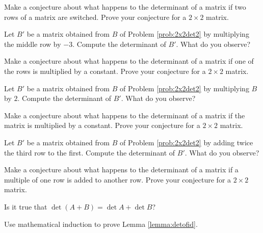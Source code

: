 \documentclass{ximera}
\begin{document}
\begin{problem}\label{prob:2x2rowswitchproof}
Make a conjecture about what happens to the determinant of a matrix if two rows of a matrix are switched.  Prove your conjecture for a $2\times 2$ matrix.
\end{problem}

\begin{problem}\label{prob:scalarmultrowdet} Let $B'$ be a matrix obtained from $B$ of Problem \ref{prob:2x2det2} by multiplying the middle row by $-3$.  Compute the determinant of $B'$.  What do you observe?
\end{problem}

\begin{problem}\label{prob:rowtimesconstant2x2proof}
Make a conjecture about what happens to the determinant of a matrix if one of the rows is multiplied by a constant.  Prove your conjecture for a $2\times 2$ matrix.
\end{problem}

\begin{problem}\label{prob:matrixtimesconst}
Let $B'$ be a matrix obtained from $B$ of Problem \ref{prob:2x2det2} by multiplying $B$ by $2$.  Compute the determinant of $B'$.  What do you observe?
\end{problem}

\begin{problem}\label{prob:matrixtimesconstant2x2proof}
Make a conjecture about what happens to the determinant of a matrix if the matrix is multiplied by a constant.  Prove your conjecture for a $2\times 2$ matrix.
\end{problem}

\begin{problem}\label{prob:scalarmultofrow}
Let $B'$ be a matrix obtained from $B$ of Problem \ref{prob:2x2det2} by adding twice the third row to the first.  Compute the determinant of $B'$.  What do you observe?
\end{problem}

\begin{problem}\label{prob:scalarmultofrow2x2}
Make a conjecture about what happens to the determinant of a matrix if a multiple of one row is added to another row.  Prove your conjecture for a $2\times 2$ matrix.
\end{problem}

\begin{problem}\label{prob:detsumsumdetquestion}
Is it true that 
$\det{(A+B)}=\det{A}+\det{B}$?
\end{problem}

\begin{problem}\label{prob:detIproof}
Use mathematical induction to prove Lemma \ref{lemma:detofid}.
\end{problem}
\end{document}
